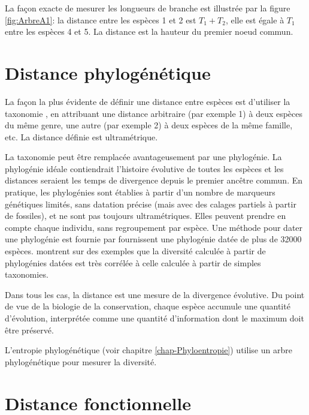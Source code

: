 \documentclass[
  11pt,
  french,
  a4paper,
  extrafontsizes,onecolumn,openright
  ]{memoir}
\begin{document}
\normalsize

La façon exacte de mesurer les longueurs de branche est illustrée par la figure \ref{fig:ArbreA1}: la distance entre les espèces 1 et 2 est \(T_1+T_2\), elle est égale à \(T_1\) entre les espèces 4 et 5.
La distance est la hauteur du premier noeud commun.

\hypertarget{sec-Dphylo}{%
\section{Distance phylogénétique}\label{sec-Dphylo}}

La façon la plus évidente de définir une distance entre espèces est d'utiliser la taxonomie \autocite[Warwick2001]{Clarke2001}, en attribuant une distance arbitraire (par exemple 1) à deux espèces du même genre, une autre (par exemple 2) à deux espèces de la même famille, etc.
La distance définie est ultramétrique.

La taxonomie peut être remplacée avantageusement par une phylogénie.
La phylogénie idéale contiendrait l'histoire évolutive de toutes les espèces et les distances seraient les temps de divergence depuis le premier ancêtre commun.
En pratique, les phylogénies sont établies à partir d'un nombre de marqueurs génétiques limités, sans datation précise (mais avec des calages partiels à partir de fossiles), et ne sont pas toujours ultramétriques.
Elles peuvent prendre en compte chaque individu, sans regroupement par espèce.
Une méthode pour dater une phylogénie est fournie par \textcite{Chave2007}
\textcite{Zanne2014} fournissent une phylogénie datée de plus de 32000 espèces.
\textcite{Ricotta2012a} montrent sur des exemples que la diversité calculée à partir de phylogénies datées est très corrélée à celle calculée à partir de simples taxonomies.

Dans tous les cas, la distance est une mesure de la divergence évolutive.
Du point de vue de la biologie de la conservation, chaque espèce accumule une quantité d'évolution, interprétée comme une quantité d'information \autocite{Crozier1997} dont le maximum doit être préservé.

L'entropie phylogénétique (voir chapitre \ref{chap-Phyloentropie}) utilise un arbre phylogénétique pour mesurer la diversité.

\hypertarget{sec-DFonctionnelle}{%
\section{Distance fonctionnelle}\label{sec-DFonctionnelle}}
\end{document}

